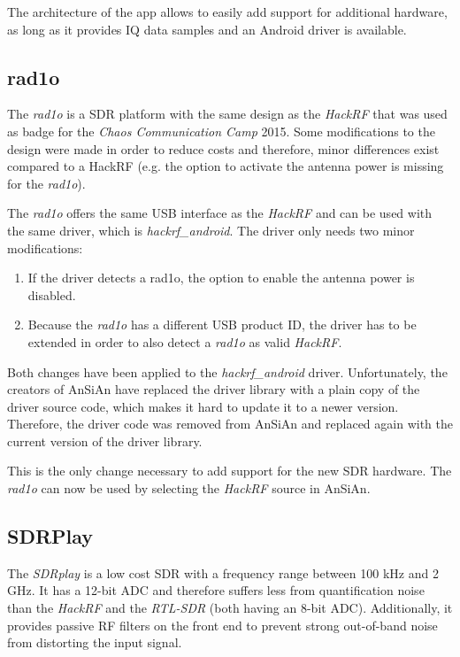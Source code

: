 The architecture of the app allows to easily add support for additional hardware,
as long as it provides IQ data samples and an Android driver is available.

\subsection{rad1o}

The \emph{rad1o} is a \ac{SDR} platform with the same design as the
\emph{HackRF} that was used as badge for the \emph{Chaos Communication Camp}
2015. Some modifications to the design were made in order to reduce costs and
therefore, minor differences exist compared to a HackRF (e.g. the option to
activate the antenna power is missing for the \emph{rad1o}).

The \emph{rad1o} offers the same USB interface as the \emph{HackRF} and can be
used with the same driver, which is \emph{hackrf\_android}. The driver only needs
two minor modifications:
\begin{enumerate}
	\item If the driver detects a rad1o, the option to enable the antenna power
		is disabled.
	\item Because the \emph{rad1o} has a different USB product ID, the driver has
		to be extended in order to also detect a \emph{rad1o} as valid \emph{HackRF}.
\end{enumerate}

Both changes have been applied to the \emph{hackrf\_android} driver. Unfortunately, the
creators of \ac{AnSiAn} have replaced the driver library with a plain copy of the driver
source code, which makes it hard to update it to a newer version. Therefore, the
driver code was removed from \ac{AnSiAn} and replaced again with the current version
of the driver library.

This is the only change necessary to add support for the new \ac{SDR} hardware. 
The \emph{rad1o} can now be used by selecting the \emph{HackRF} source in \ac{AnSiAn}.


\subsection{SDRPlay}

The \emph{SDRplay} is a low cost \ac{SDR} with a frequency range between 100 kHz and
2 GHz. It has a 12-bit \ac{ADC} and therefore suffers less from quantification noise
than the \emph{HackRF} and the \emph{RTL-SDR} (both having an 8-bit \ac{ADC}).
Additionally, it provides passive \ac{RF} filters on the front end to prevent strong
out-of-band noise from distorting the input signal.

